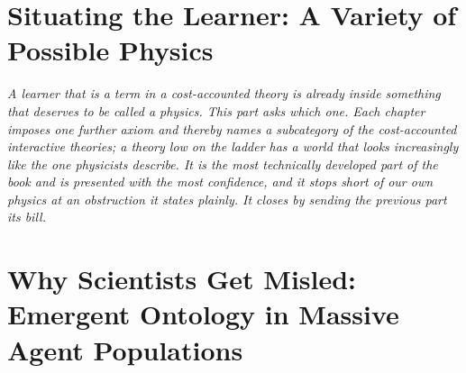 \documentclass[12pt,openright,twoside]{book}
\theoremstyle{remark}
\theoremstyle{plain}
\theoremstyle{remark}
\theoremstyle{plain}
\theoremstyle{plain}
\begin{document}
\part{Situating the Learner: A Variety of Possible Physics}
\label{part:physics}

\vspace{1em}
\begin{mdframed}[backgroundcolor=remarkgray, linecolor=gray!60,
                 linewidth=1pt, topline=false, rightline=false,
                 bottomline=false]
\small\itshape
A learner that is a term in a cost-accounted theory is already inside
something that deserves to be called a physics.
This part asks which one.
Each chapter imposes one further axiom and thereby names a subcategory of
the cost-accounted interactive theories; a theory low on the ladder has a
world that looks increasingly like the one physicists describe.
It is the most technically developed part of the book and is presented
with the most confidence, and it stops short of our own physics at an
obstruction it states plainly.
It closes by sending the previous part its bill.
\end{mdframed}

\bigskip


\part{Why Scientists Get Misled: Emergent Ontology in Massive Agent Populations}
\label{part:sciencebot}
\end{document}
